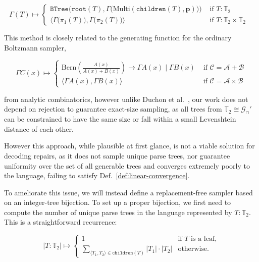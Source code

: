 \documentclass[runningheads]{llncs}
\begin{document}
\begin{equation}\label{eq:pcfg_sampler}
  \Gamma(T) \mapsto \begin{cases}
        \texttt{BTree}\Big(\texttt{root}(T), \Gamma\big(\text{Multi}(\texttt{children}(T), \mathbf{p})\big)\Big) & \text{ if $T: \mathbb{T}_2$ } \\
        \big\langle \Gamma\big(\pi_1(T)\big), \Gamma\big(\pi_2(T)\big) \big\rangle & \text{ if $T: \mathbb{T}_2\times\mathbb{T}_2$ }
  \end{cases}
\end{equation}

\noindent This method is closely related to the generating function for the ordinary Boltzmann sampler,

\begin{equation}
  \Gamma C(x) \mapsto \begin{cases}
  \text{Bern} \left(\frac{A(x)}{A(x) + B(x)}\right) \rightarrow \Gamma A(x) \mid \Gamma B(x) & \text{ if } \mathcal{C}=\mathcal{A}+\mathcal{B} \\
  \big\langle \Gamma A(x), \Gamma B(x)\big\rangle & \text{ if } \mathcal{C}=\mathcal{A} \times \mathcal{B}
  \end{cases}
\end{equation}

\noindent from analytic combinatorics, however unlike Duchon et al.~\cite{duchon2004boltzmann}, our work does not depend on rejection to guarantee exact-size sampling, as all trees from $\mathbb{T}_2\cong\mathcal{G}_\cap'$ can be constrained to have the same size or fall within a small Levenshtein distance of each other.

  However this approach, while plausible at first glance, is not a viable solution for decoding repairs, as it does not sample unique parse trees, nor guarantee uniformity over the set of all generable trees and converges extremely poorly to the language, failing to satisfy Def.~\ref{def:linear-convergence}.

  To ameliorate this issue, we will instead define a replacement-free sampler based on an integer-tree bijection. To set up a proper bijection, we first need to compute the number of unique parse trees in the language represented by $T: \mathbb{T}_2$. This is a straightforward recurrence:

\begin{equation}
  |T: \mathbb{T}_2| \mapsto \begin{cases}
    1 & \text{if $T$ is a leaf,} \\
    \sum_{\langle T_1, T_2\rangle \in \texttt{children}(T)} |T_1| \cdot |T_2| & \text{otherwise.}
  \end{cases}
\end{equation}
\end{document}
